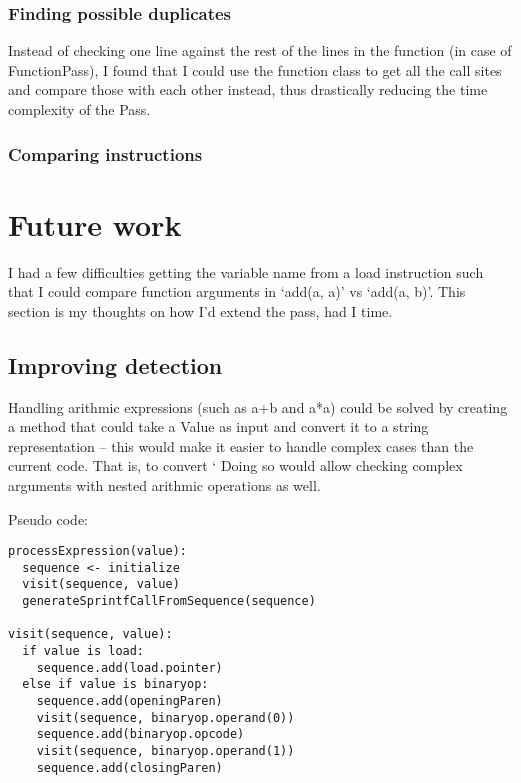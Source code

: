 \documentclass[a4paper,11pt]{article}
\theoremstyle{mytheor}
\begin{document}
\subsubsection*{Finding possible duplicates}
Instead of checking one line against the rest of the lines in the function (in case of FunctionPass), I found that I could use the function class to get all the call sites and compare those with each other instead, thus drastically reducing the time complexity of the Pass.



\subsubsection*{Comparing instructions}



\section*{Future work}
I had a few difficulties getting the variable name from a load instruction such that I could compare function arguments in `add(a, a)' vs `add(a, b)'. This section is my thoughts on how I'd extend the pass, had I time.

\subsection*{Improving detection}
Handling arithmic expressions (such as a+b and a*a) could be solved by creating a method that could take a Value as input and convert it to a string representation -- this would make it easier to handle complex cases than the current code.
That is, to convert `%
Doing so would allow checking complex arguments with nested arithmic operations as well.

Pseudo code:

\begin{verbatim}
processExpression(value):
  sequence <- initialize
  visit(sequence, value)
  generateSprintfCallFromSequence(sequence)

visit(sequence, value):
  if value is load:
    sequence.add(load.pointer)
  else if value is binaryop:
    sequence.add(openingParen)
    visit(sequence, binaryop.operand(0))
    sequence.add(binaryop.opcode)
    visit(sequence, binaryop.operand(1))
    sequence.add(closingParen)
\end{verbatim}
\end{document}
